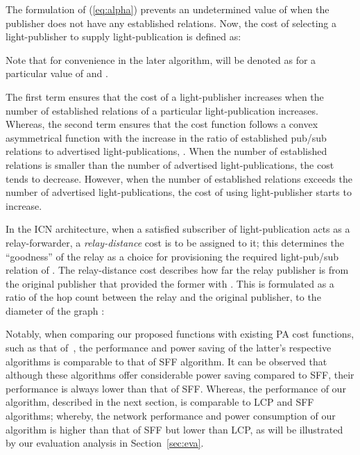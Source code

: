 \documentclass[journal]{IEEEtran}
\begin{document}
The formulation of (\ref{eq:alpha}) prevents an undetermined value of  when the publisher does not have any established relations. Now, the cost of selecting a light-publisher  to supply light-publication  is defined as:

Note that for convenience in the later algorithm,  will be denoted as  for a particular value of  and .

The first term ensures that the cost of a light-publisher increases when the number of established relations of a particular light-publication increases. Whereas, the second term ensures that the cost function follows a convex asymmetrical function with the increase in the ratio of established pub/sub relations to advertised light-publications, . When the number of established relations is smaller than the number of advertised light-publications, the cost tends to decrease. However, when the number of established relations exceeds the number of advertised light-publications, the cost of using light-publisher  starts to increase.

In the ICN architecture, when a satisfied subscriber of
light-publication  acts as a relay-forwarder, a
\emph{relay-distance} cost is to be assigned to it; this determines
the ``goodness'' of the relay as a choice for provisioning the
required light-pub/sub relation of . The relay-distance cost
describes how far the relay publisher is from the original publisher that provided the former with . This is formulated as a ratio of the hop count between the relay and the original publisher, to the diameter of the graph :

 Notably, when comparing our proposed functions with existing PA cost functions, such as that of~\cite{coi:alloptic, wia:alloptic}, the performance and power saving of the latter's respective algorithms is comparable to that of SFF algorithm. It can be observed that although these algorithms offer considerable power saving compared to SFF, their performance is always lower than that of SFF. Whereas, the performance of our algorithm, described in the next section, is comparable to LCP and SFF algorithms; whereby, the network performance and power consumption of our algorithm is higher than that of SFF but lower than LCP, as will be illustrated by our evaluation analysis in Section~\ref{sec:eva}.
\end{document}
